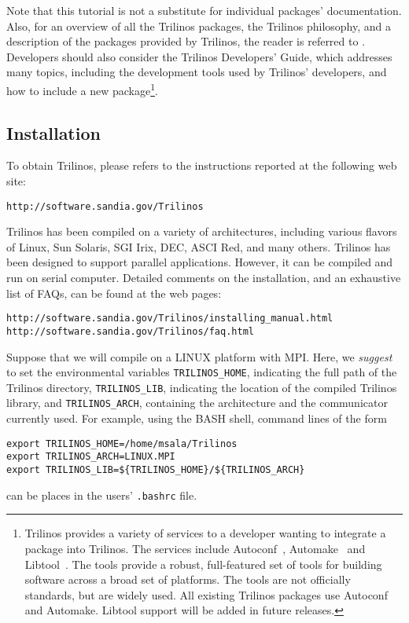 Note that this tutorial is not a substitute for individual packages'
documentation. Also, for an overview of all the Trilinos packages, the
Trilinos philosophy, and a description of the packages provided by
Trilinos, the reader is referred to \cite{Trilinos-Overview}.
Developers should also consider the Trilinos Developers' Guide, which
addresses many topics, including the development tools used by Trilinos'
developers, and how to include a new package\footnote{ Trilinos provides
  a variety of services to a developer wanting to integrate a package
  into Trilinos.  The services include Autoconf~\cite{Autoconf},
  Automake~\cite{Automake} and Libtool~\cite{Libtool}. The tools provide
  a robust, full-featured set of tools for building software across a
  broad set of platforms.  The tools are not officially standards, but
  are widely used.  All existing Trilinos packages use Autoconf and
  Automake.  Libtool support will be added in future releases.}.


\subsection{Installation}
\label{sec:installing}

To obtain Trilinos, please refers to the instructions reported at the
following web site:
\begin{verbatim}
http://software.sandia.gov/Trilinos
\end{verbatim}

Trilinos has been compiled on a variety of architectures, including
various flavors of Linux, Sun Solaris, SGI Irix, DEC, ASCI Red, and many
others. Trilinos has been designed to support parallel applications.
However, it can be compiled and run on serial computer.  Detailed
comments on the installation, and an exhaustive list of FAQs, can be
found at the web pages:
\begin{verbatim}
http://software.sandia.gov/Trilinos/installing_manual.html
http://software.sandia.gov/Trilinos/faq.html
\end{verbatim}


Suppose that we will compile on a LINUX platform with MPI. Here, we {\sl
  suggest} to set the environmental
variables \verb!TRILINOS_HOME!, indicating the full path of the Trilinos
directory, \verb!TRILINOS_LIB!, indicating the location of the compiled
Trilinos library, and \verb!TRILINOS_ARCH!, containing the architecture
and the communicator currently used.  For example, using the BASH shell,
command lines of the form
\begin{verbatim}
export TRILINOS_HOME=/home/msala/Trilinos
export TRILINOS_ARCH=LINUX.MPI
export TRILINOS_LIB=${TRILINOS_HOME}/${TRILINOS_ARCH}
\end{verbatim}
can be places in the users' \verb!.bashrc! file.

